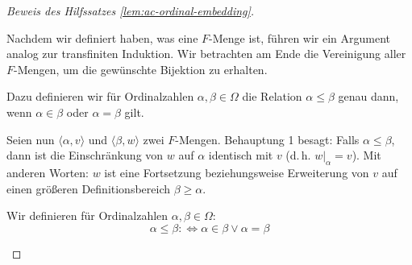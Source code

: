 \begin{proof}[Beweis des Hilfssatzes \ref{lem:ac-ordinal-embedding}]
\begin{spoken-clean}[01:06:31 - 01:08:09]
Nachdem wir definiert haben, was eine $F$-Menge ist, führen wir ein Argument analog zur transfiniten Induktion. Wir betrachten am Ende die Vereinigung aller $F$-Mengen, um die gewünschte Bijektion zu erhalten.

Dazu definieren wir für Ordinalzahlen $\alpha, \beta \in \Omega$ die Relation $\alpha \le \beta$ genau dann, wenn $\alpha \in \beta$ oder $\alpha = \beta$ gilt.

Seien nun $\langle \alpha, v \rangle$ und $\langle \beta, w \rangle$ zwei $F$-Mengen. Behauptung 1 besagt: Falls $\alpha \le \beta$, dann ist die Einschränkung von $w$ auf $\alpha$ identisch mit $v$ (d.\,h. $w|_\alpha = v$). Mit anderen Worten: $w$ ist eine Fortsetzung beziehungsweise Erweiterung von $v$ auf einen größeren Definitionsbereich $\beta \ge \alpha$.
\end{spoken-clean}

\begin{math-stroke}
Wir definieren für Ordinalzahlen $\alpha, \beta \in \Omega$:
\[
\alpha \le \beta :\iff \alpha \in \beta \lor \alpha = \beta
\]


\begin{center}
\end{center}
\end{math-stroke}


\end{proof}

